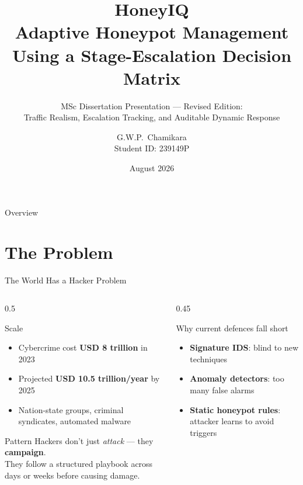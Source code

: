 \documentclass[aspectratio=169, 12pt]{beamer}
\title[HoneyIQ]{%
  \textbf{HoneyIQ}\\
  \large Adaptive Honeypot Management\\
  Using a Stage-Escalation Decision Matrix}
\subtitle{MSc Dissertation Presentation --- Revised Edition:\\
  Traffic Realism, Escalation Tracking, and Auditable Dynamic Response}
\author{G.W.P.\ Chamikara \\ \small Student ID: 239149P}
\institute{%
  Department of Computer Science \& Engineering\\
  Faculty of Engineering}
\date{August 2026}
\begin{document}
\begin{frame}
  \titlepage
\end{frame}

\begin{frame}{Overview}
  \tableofcontents
\end{frame}

\section{The Problem}

\begin{frame}{The World Has a Hacker Problem}
  \begin{columns}[T]
    \begin{column}{0.5\textwidth}
      \begin{alertblock}{Scale}
        \begin{itemize}
          \item Cybercrime cost \textbf{USD 8 trillion} in 2023
          \item Projected \textbf{USD 10.5 trillion/year} by 2025
          \item Nation-state groups, criminal syndicates, automated malware
        \end{itemize}
      \end{alertblock}
      \vspace{0.4cm}
      \begin{block}{Pattern}
        Hackers don't just \emph{attack} --- they \textbf{campaign}.\\
        They follow a structured playbook across days or weeks before causing damage.
      \end{block}
    \end{column}
    \begin{column}{0.45\textwidth}
      \begin{block}{Why current defences fall short}
        \begin{itemize}
          \item \textbf{Signature IDS}: blind to new techniques
          \item \textbf{Anomaly detectors}: too many false alarms
          \item \textbf{Static honeypot rules}: attacker learns to avoid triggers
        \end{itemize}
      \end{block}
    \end{column}
  \end{columns}
\end{frame}
\end{document}
